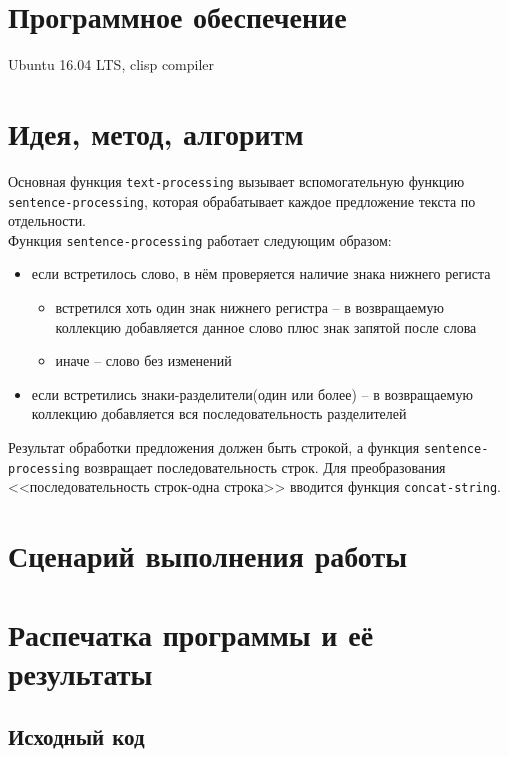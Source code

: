 \documentclass[12pt]{article}
\begin{document}
\section{Программное обеспечение}
Ubuntu 16.04 LTS, clisp compiler

\section{Идея, метод, алгоритм}
Основная функция {\tt text-processing} вызывает вспомогательную функцию \\
{\tt sentence-processing}, которая обрабатывает каждое предложение текста по отдельности.\\

Функция {\tt sentence-processing} работает следующим образом:
\begin{itemize}
\setlength{\itemsep}{-1mm} %
\item если встретилось слово, в нём проверяется наличие знака нижнего региста
\begin{itemize}
\item встретился хоть один знак нижнего регистра -- в возвращаемую коллекцию добавляется данное слово плюс знак запятой после слова
\item иначе -- слово без изменений
\end{itemize}
\item если встретились знаки-разделители(один или более) -- в возвращаемую коллекцию добавляется вся последовательность разделителей
\end{itemize}

Результат обработки предложения должен быть строкой, а функция {\tt sentence-processing} возвращает последовательность строк. Для преобразования <<последовательность строк-одна строка>> вводится функция {\tt concat-string}.


\section{Сценарий выполнения работы}

\section{Распечатка программы и её результаты}

\subsection{Исходный код}
\end{document}
